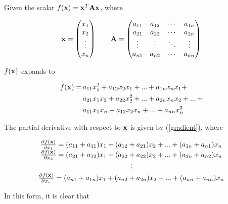\documentclass{article}
\newcommand{\vect}[1]{\textbf{\textrm{#1}}}
\newcommand{\pd}[2]{\frac{\partial {#1}}{\partial {#2}}}
\begin{document}
Given the scalar $f(\vect{x}) = \vect{x}^{T}\vect{A}\vect{x}$, where

\begin{equation*}
	\vect{x}= 
	\begin{pmatrix}
		x_1 \\ 
		x_2 \\ 
		\vdots \\ 
		x_n
	\end{pmatrix}
	\qquad \vect{A} = 
	\begin{pmatrix}
		a_{11} & a_{12} & \cdots & a_{1n} \\
		a_{21} & a_{22} & \cdots & a_{2n} \\
		\vdots & \vdots & \ddots & \vdots \\
		a_{n1} & a_{n2} & \cdots & a_{nn}
	\end{pmatrix}
\end{equation*}

$f(\vect{x})$ expands to

\begin{align*}
	f(\vect{x}) = \, & a_{11}x_1^2 + a_{12}x_2x_1 + ... + a_{1n}x_nx_1 + \\
				  & a_{21}x_1x_2 + a_{22}x_2^2 + ... + a_{2n}x_nx_2 + ... \, + \\
				  & a_{11}x_1x_n + a_{12}x_2x_n + ... + a_{nn}x_n^2
\end{align*}

The partial derivative with respect to $\vect{x}$ is given by (\ref{gradient}), where

\begin{equation*}
	\begin{matrix}
		\pd{f(\vect{x})}{x_1} = (a_{11} + a_{11})x_1 + (a_{12} + a_{21})x_2 + ... + 
							   	(a_{1n} + a_{n1})x_n \\
		\pd{f(\vect{x})}{x_2} = (a_{21} + a_{12})x_1 + (a_{22} + a_{22})x_2 + ... + 
							   	(a_{2n} + a_{n2})x_n \\
		\vdots \\
		\pd{f(\vect{x})}{x_n} = (a_{n1} + a_{1n})x_1 + (a_{n2} + a_{2n})x_2 + ... + 
							   	(a_{nn} + a_{nn})x_n 
	\end{matrix}
\end{equation*}

In this form, it is clear that
\end{document}
